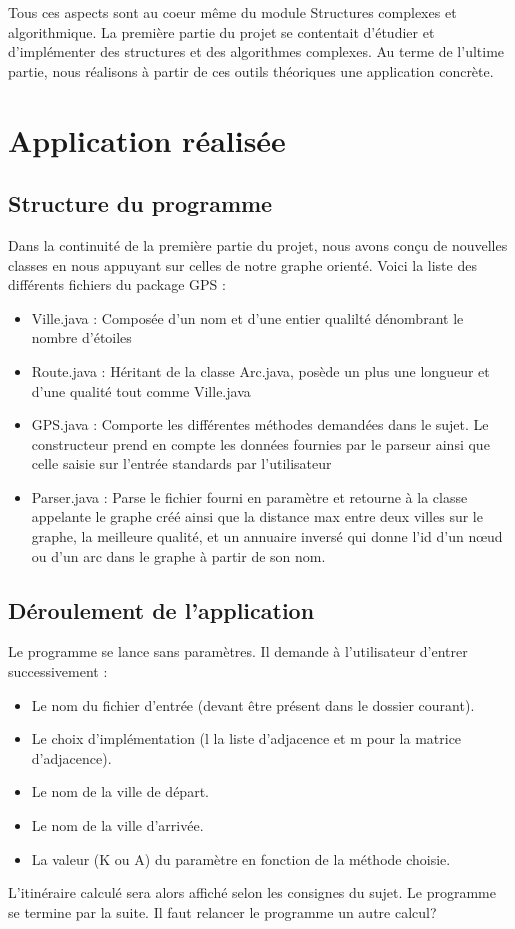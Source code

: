 Tous ces aspects sont au coeur même du module Structures complexes et algorithmique. La première partie du projet se contentait d'étudier et d'implémenter des structures et des algorithmes complexes. Au terme de l'ultime partie, nous réalisons à partir de ces outils  théoriques une application concrète.

\clearpage

\section{Application réalisée}

\subsection{Structure du programme}
Dans la continuité de la première partie du projet, nous avons conçu de nouvelles classes en nous appuyant sur celles de notre graphe orienté. Voici la liste des différents fichiers du package GPS : 

\begin{itemize}
\item
Ville.java : Composée d'un nom et d'une entier qualilté dénombrant le nombre d'étoiles
\item
Route.java : Héritant de la classe Arc.java, posède un plus une longueur  et d'une qualité tout comme Ville.java
\item
GPS.java : Comporte les différentes méthodes demandées dans le sujet. Le constructeur prend en compte les données fournies par le parseur ainsi que celle saisie sur l'entrée standards par l'utilisateur
\item
Parser.java : Parse le fichier fourni en paramètre et retourne à la classe appelante le graphe créé ainsi que la distance max entre deux villes sur le graphe, la meilleure qualité, et un annuaire inversé qui donne l'id d'un nœud ou d'un arc dans le graphe à partir de son nom.
\end{itemize}


\subsection{Déroulement de l'application}
Le programme se lance sans paramètres. Il demande à l'utilisateur d'entrer successivement : 
\begin{itemize}
\item
Le nom du fichier d'entrée (devant être présent dans le dossier courant).
\item
Le choix d'implémentation (l la liste d'adjacence et m pour la matrice d'adjacence).
\item
Le nom de la ville de départ.
\item
Le nom de la ville d'arrivée.
\item 
La valeur (K ou A) du paramètre en fonction de la méthode choisie.
\end{itemize}
L'itinéraire calculé sera alors affiché selon les consignes du sujet. Le programme se termine par la suite. Il faut relancer le programme un autre calcul?
 

